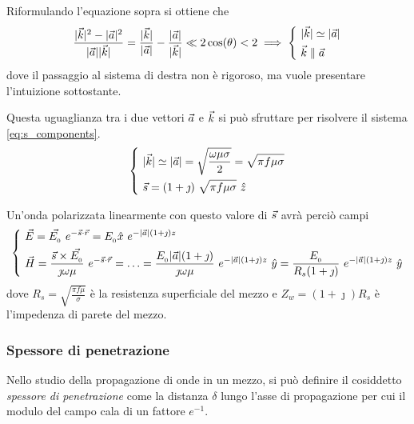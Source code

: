 		Riformulando l'equazione sopra si ottiene che
		\begin{equation*}
			\frac{|\vec{k}|^2 - |\vec{a}|^2}{|\vec{a}| |\vec{k}|}
				= \frac{|\vec{k}|}{|\vec{a}|} - \frac{|\vec{a}|}{|\vec{k}|}
				\ll 2 \cos(\theta) < 2 \implies
				\begin{dcases}
					~ |\vec{k}| \simeq |\vec{a}| \\
					~ \vec{k} \parallel \vec{a}
				\end{dcases}
		\end{equation*}
		dove il passaggio al sistema di destra non è rigoroso, ma vuole presentare l'intuizione sottostante.

		Questa uguaglianza tra i due vettori $\vec{a}$ e $\vec{k}$ si può sfruttare per risolvere il sistema \eqref{eq:s_components}.
		\begin{equation*}
			\begin{dcases}
				~ |\vec{k}| \simeq |\vec{a}|
					= \sqrt{\frac{\omega \mu \sigma}{2}}
					= \sqrt{\pi f \mu \sigma} \\
				~ \vec{s} = (1 + \jmath) ~ \sqrt{\pi f \mu \sigma} ~ \hat{z} \\
			\end{dcases}
		\end{equation*}

		Un'onda polarizzata linearmente con questo valore di $\vec{s}$ avrà perciò campi
		\begin{equation*}
			\begin{dcases}
				~ \vec{E} = \vec{E_{_{0}}} ~ e^{-\vec{s} \cdot \vec{r}} = E_{_{0}} \hat{x} ~ e^{-|\vec{a}| (1 + \jmath) z} \\
				~ \vec{H} = \frac{\vec{s} \times \vec{E_{_{0}}}}{\jmath \omega \mu} ~ e^{-\vec{s} \cdot \vec{r}}
					= \ldots = \frac{E_{_{0}} |\vec{a}| (1 + \jmath)}{\jmath \omega \mu} ~ e^{-|\vec{a}| (1 + \jmath) z} ~ \hat{y}
					= \frac{E_{_{0}}}{ R_s (1 + \jmath) } ~ e^{-|\vec{a}| (1 + \jmath) z} ~ \hat{y}
			\end{dcases}
		\end{equation*}
		dove $R_s = \sqrt{\frac{\pi f \mu}{\sigma}}$ è la resistenza superficiale del mezzo e $Z_w = (1 + \jmath) R_s$ è l'impedenza di parete del mezzo.

		\subsubsection{Spessore di penetrazione}
		Nello studio della propagazione di onde in un mezzo, si può definire il cosiddetto \emph{spessore di penetrazione} come la distanza $\delta$ lungo l'asse di propagazione per cui il modulo del campo cala di un fattore $e^{-1}$.

